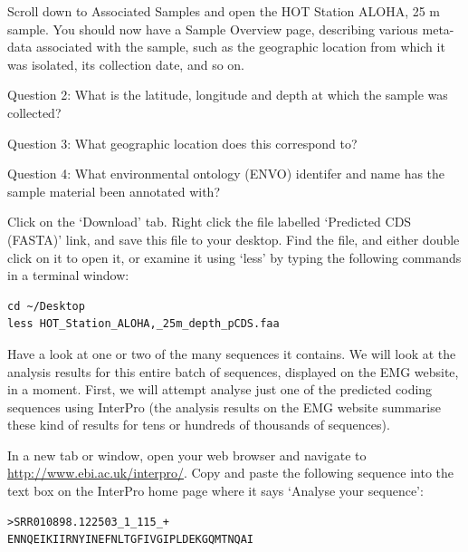\begin{steps}
Scroll down to Associated Samples and open the HOT Station ALOHA, 25 m sample.
You should now have a Sample Overview page, describing various meta-data associated with the sample, such as the geographic location from which it was isolated, its collection date, and so on.
\end{steps}

\begin{questions}
Question 2: What is the latitude, longitude and depth at which the sample was collected?
\end{questions}

\begin{questions}
Question 3: What geographic location does this correspond to?
\end{questions}

\begin{questions}
Question 4: What environmental ontology (ENVO) identifer and name has the sample material been annotated with?
\end{questions}

\begin{steps}
Click on the ‘Download’ tab. Right click the file labelled ‘Predicted CDS (FASTA)’ link, and save this file to your desktop. Find the file, and either double click on it to open it, or examine it using ‘less’ by typing the following commands in a terminal window:
\begin{lstlisting}
cd ~/Desktop
less HOT_Station_ALOHA,_25m_depth_pCDS.faa
\end{lstlisting}
\end{steps}

Have a look at one or two of the many sequences it contains.
We will look at the analysis results for this entire batch of sequences, displayed on the EMG website, in a moment. First, we will attempt analyse just one of the predicted coding sequences using InterPro (the analysis results on the EMG website summarise these kind of results for tens or hundreds of thousands of sequences).

\begin{steps}
In a new tab or window, open your web browser and navigate to \url{http://www.ebi.ac.uk/interpro/}. Copy and paste the following sequence into the text box on the InterPro home page where it says ‘Analyse your sequence’:
\begin{lstlisting}
>SRR010898.122503_1_115_+
ENNQEIKIIRNYINEFNLTGFIVGIPLDEKGQMTNQAI
\end{lstlisting}
\end{steps}

